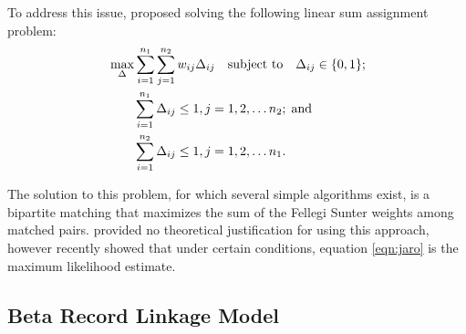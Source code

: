 \documentclass[12pt,letterpaper]{article}
\newcommand{\1}[1]{\mathbb{I}\!\left[#1\right]} %
\begin{document}
To address this issue, \cite{jaro1989} proposed solving the following linear sum assignment problem:
\begin{align}
	\label{eqn:jaro}
	&\max_{\Delta} \sum_{i=1}^{n_1} \sum_{j=1}^{n_2} w_{ij} \Delta_{ij} 
	\quad \text{subject to} \quad \Delta_{ij} \in \{0,1\}; \\
	& \quad \quad \sum_{i=1}^{n_1}  \Delta_{ij}  \leq 1, j=1,2, \ldots n_2; \; \text{and} \notag\\
	& \quad \quad\sum_{i=1}^{n_2}  \Delta_{ij}  \leq 1, j=1,2, \ldots n_1. \notag
\end{align}

The solution to this problem, for which several simple algorithms exist, is a bipartite matching that maximizes the sum of the Fellegi Sunter weights among matched pairs. \cite{jaro1989} provided no theoretical justification for using this approach, however \cite{sadinle_bayesian_2017} recently showed that under certain conditions, equation \ref{eqn:jaro} is the maximum likelihood estimate. 


\subsection{Beta Record Linkage Model}
\end{document}
